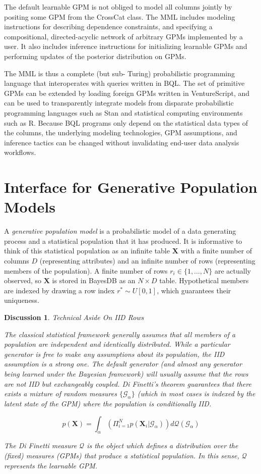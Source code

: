 \documentclass[10pt,letterpaper]{article}
\newtheorem{discussion}{Discussion}[section]
\newcommand{\set}[1]{\{#1\}}
\begin{document}
The default learnable GPM is not obliged to model all columns jointly by
positing some GPM from the CrossCat class. The MML includes modeling
instructions for describing dependence constraints, and specifying a
compositional, directed-acyclic network of arbitrary GPMs implemented by a user.
It also includes inference instructions for initializing learnable GPMs and
performing updates of the posterior distribution on GPMs.

The MML is thus a complete (but sub- Turing) probabilistic programming language
that interoperates with queries written in BQL. The set of primitive GPMs can be
extended by loading foreign GPMs written in VentureScript, and can be used to
transparently integrate models from disparate probabilistic programming
languages such as Stan and statistical computing environments such as R. Because
BQL programs only depend on the statistical data types of the columns, the
underlying modeling technologies, GPM assumptions, and inference tactics can be
changed without invalidating end-user data analysis workflows.

\section{Interface for Generative Population Models} \label{sec:generators}
A \textit{generative population model} is a probabilistic model of a data
generating process and a statistical population that it has produced. It is
informative to think of this statistical population as an infinite table
$\mathbf{X}$ with a finite number of columns $D$ (representing attributes) and
an infinite number of rows (representing members of the population). A finite
number of rows $r_i \in
\set{1,\dots,N}$ are actually observed, so $\mathbf{X}$ is stored in BayesDB as
an $N \times D$ table. Hypothetical members are indexed by drawing a row index
$r^*\sim U[0,1]$, which guarantees their uniqueness.

\begin{discussion} \label{disc:iid} Technical Aside On IID Rows

The classical statistical framework generally assumes that all members of a
population are independent and identically distributed. While a particular
generator is free to make any assumptions about its population, the IID
assumption is a strong one. The default generator (and almost any generator
being learned under the Bayesian framework) will usually assume that the rows
are not IID but exchangeably coupled. Di Finetti's theorem guarantees that there
exists a mixture of random measures $\set{\mathcal{G}_\alpha}$ (which in most
cases is indexed by the latent state of the GPM) where the population is
conditionally IID.

$$p(\mathbf{X}) = \int_\alpha{(\Pi_{i=1}^Np(\mathbf{X}_i|\mathcal{G}_\alpha))d
\mathcal{Q}(\mathcal{G}_\alpha)}$$

The Di Finetti measure $\mathcal{Q}$ is the object which defines a distribution
over the (fixed) measures (GPMs) that produce a statistical population. In this
sense, $\mathcal{Q}$ represents the learnable GPM.

\end{discussion}
\end{document}
